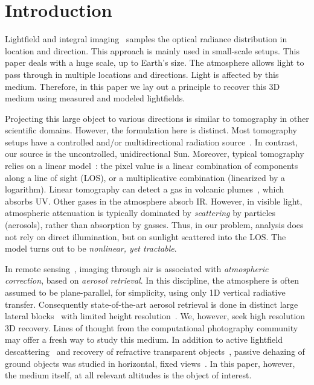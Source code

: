 \documentclass[10pt,twocolumn,letterpaper]{article}
\begin{document}
\section{Introduction}

Lightfield and integral imaging~\cite{bishop,horstmeyer,levoy,kim}  samples the optical radiance distribution in location and direction. This approach is mainly used in small-scale setups. This paper deals with a huge scale, up to Earth's size.
The atmosphere allows light to pass through in multiple locations and directions. Light is affected by this medium. Therefore, in this paper we lay out a principle to recover this 3D medium using measured and modeled lightfields.

Projecting this large object to various directions is similar to tomography in other scientific domains. However, the formulation here is distinct. Most tomography setups have a controlled and/or multidirectional radiation source~\cite{gorbunov,messer}. In contrast, our source is the uncontrolled, unidirectional Sun. Moreover, typical tomography relies on a linear model~\cite{gregson}: the pixel value is a linear combination of components along a line of sight (LOS), or a multiplicative combination (linearized by a logarithm). Linear tomography can detect a gas in volcanic plumes~\cite{wright}, which absorbs UV. Other gases in the atmosphere absorb IR. However, in visible light, atmospheric attenuation is typically dominated by {\em scattering} by particles (aerosols), rather than absorption by gasses. Thus, %
in our problem, analysis does not rely on direct illumination, but on sunlight scattered into the LOS. The model turns out to be {\em nonlinear, yet tractable}.

In remote sensing~\cite{diner,kokhan}, imaging through air is associated with {\em atmospheric correction}, based on {\em aerosol retrieval}. In this discipline, the atmosphere is often assumed to be plane-parallel, for simplicity, using only 1D vertical radiative transfer. Consequently state-of-the-art aerosol retrieval is done in distinct large lateral blocks~\cite{matronchik} with limited height resolution~\cite{kalashnikova}. We, however, seek high resolution 3D recovery. Lines of thought from the computational photography community may offer a fresh way to study this medium. In addition to active lightfield descattering~\cite{fuchs,levoy,kim} and recovery of refractive transparent objects~\cite{ihrke}, passive dehazing of ground objects was studied in horizontal, fixed views~\cite{fattal,he,kopf,kratz,narasimhan2,oakley,Hschechner2,tan}. In this paper, however, the medium itself, at all relevant altitudes is the object of interest.
\end{document}
